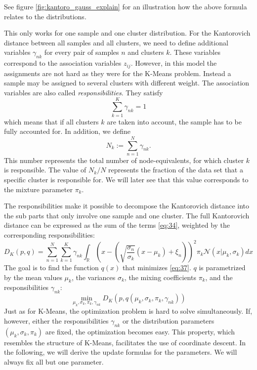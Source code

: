 See figure \ref{fig:kantoro_gauss_explain} for an illustration how the above formula relates to the distributions.

This only works for one sample and one cluster distribution.
For the Kantorovich distance between all samples and all clusters, we need to define additional variables $\gamma_{nk}$ for every pair of samples $n$ and clusters $k$.
These variables correspond to the association variables $z_{ij}$.
However, in this model the assignments are not hard as they were for the K-Means problem.
Instead a sample may be assigned to several clusters with different weight.
The association variables are also called \textit{responsibilities}.
They satisfy
\begin{equation}
  \label{eq:35}
  \sum_{k=1}^K\gamma_{nk} = 1
\end{equation}
which means that if all clusters $k$ are taken into account, the sample has to be fully accounted for.
In addition, we define
\begin{equation}
  \label{eq:36}
  N_k := \sum_{n=1}^N \gamma_{nk}.
\end{equation}
This number represents the total number of node-equivalents, for which cluster $k$ is responsible.
The value of $N_k/N$ represents the fraction of the data set that a specific cluster is responsible for.
We will later see that this value corresponds to the mixture parameter $\pi_k$.

The responsibilities make it possible to decompose the Kantorovich distance into the sub parts that only involve one sample and one cluster.
The full Kantorovich distance can be expressed as the sum of the terms \eqref{eq:34}, weighted by the corresponding responsibilities:
\begin{equation}
  \label{eq:37}
  D_K(p,q) = \sum_{n=1}^N\sum_{k=1}^K\gamma_{nk}\int_\mathbb{R}\left(x-\left(\sqrt{\frac{\sigma_n}{\sigma_k}}(x-\mu_k)+\xi_n\right)\right)^2\pi_k\mathcal{N}(x|\mu_k,\sigma_k)dx
\end{equation}
The goal is to find the function $q(x)$ that minimizes \eqref{eq:37}.
$q$ is parametrized by the mean values $\mu_k$, the variances $\sigma_k$, the mixing coefficients $\pi_k$, and the responsibilities $\gamma_{nk}$:
\begin{equation}
  \label{eq:38}
  \min\limits_{\mu_k,\sigma_k,\pi_k, \gamma_{nk}}D_K(p,q(\mu_k,\sigma_k,\pi_k, \gamma_{nk}))
\end{equation}
Just as for K-Means, the optimization problem is hard to solve simultaneously.
If, however, either the responsibilities $\gamma_{nk}$ or the distribution parameters $(\mu_k, \sigma_k, \pi_k)$ are fixed, the optimization becomes easy.
This property, which resembles the structure of K-Means, facilitates the use of coordinate descent.
In the following, we will derive the update formulas for the parameters.
We will always fix all but one parameter.

